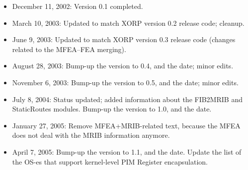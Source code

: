 \documentclass[11pt]{article}
\begin{document}
\begin{itemize}

  \item December 11, 2002: Version 0.1 completed.

  \item March 10, 2003: Updated to match XORP version 0.2 release code;
  cleanup.

  \item June 9, 2003: Updated to match XORP version 0.3 release code
  (changes related to the MFEA--FEA merging).

  \item August 28, 2003: Bump-up the version to 0.4, and the date;
  minor edits.

  \item November 6, 2003: Bump-up the version to 0.5, and the date;
  minor edits.

  \item July 8, 2004: Status updated; added information about the FIB2MRIB
  and StaticRoutes modules. Bump-up the version to 1.0, and the date.

  \item January 27, 2005: Remove MFEA+MRIB-related text, because the MFEA
  does not deal with the MRIB information anymore.

  \item April 7, 2005: Bump-up the version to 1.1, and the date.
  Update the list of the OS-es that support kernel-level PIM Register
  encapsulation.

\end{itemize}





\end{document}
